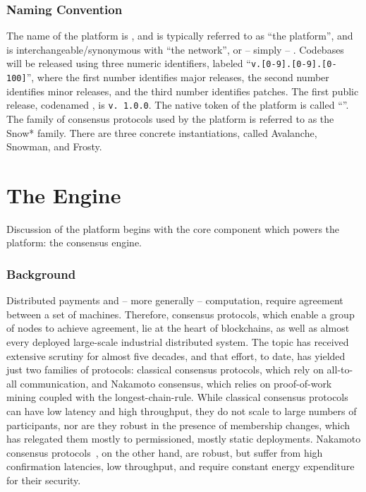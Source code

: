 \documentclass[runningheads]{llncs}
\begin{document}
\subsubsection{Naming Convention}
The name of the platform is \AVAPlatformName{}, and is typically referred to as ``the \AVAPlatformName{} platform'', and is interchangeable/synonymous with ``the \AVAPlatformName{} network'', or -- simply -- \AVAPlatformName{}. 
Codebases will be released using three numeric identifiers, labeled ``\texttt{v.[0-9].[0-9].[0-100]}'', where the first number identifies major releases, the second number identifies minor releases, and the third number identifies patches. The first public release, codenamed \AVAPlatformNameFirstRelease{}, is \texttt{v. 1.0.0}. The native token of the platform is called ``\AVATokenName{}''.
The family of consensus protocols used by the \AVAPlatformName{} platform is referred to as the Snow* family. There are three concrete instantiations, called Avalanche, Snowman, and Frosty. 

\section{The Engine}
\label{section:engine}
Discussion of the \AVAPlatformName{} platform begins with the core component which powers the platform: the consensus engine.
\subsubsection{Background}
Distributed payments and -- more generally -- computation, require agreement between a set of machines. Therefore, consensus protocols, which enable a group of nodes to achieve agreement, lie at the heart of blockchains, as well as almost every deployed large-scale industrial distributed system.
The topic has received extensive scrutiny for almost five decades, and that effort, to date, has yielded just two families of protocols:
classical consensus protocols, which rely on all-to-all communication, and Nakamoto consensus, which relies on proof-of-work mining coupled with the longest-chain-rule.
While classical consensus protocols can have low latency and high throughput, they do not scale to large numbers of participants, nor are they robust in the
presence of membership changes, which has relegated them mostly to permissioned, mostly static deployments.
Nakamoto consensus protocols~\cite{nakamoto2008bitcoin,wood2014ethereum,EyalGSR16}, on the other hand, are robust, but suffer from high confirmation latencies, low throughput, and require constant energy expenditure for their security.
\end{document}
